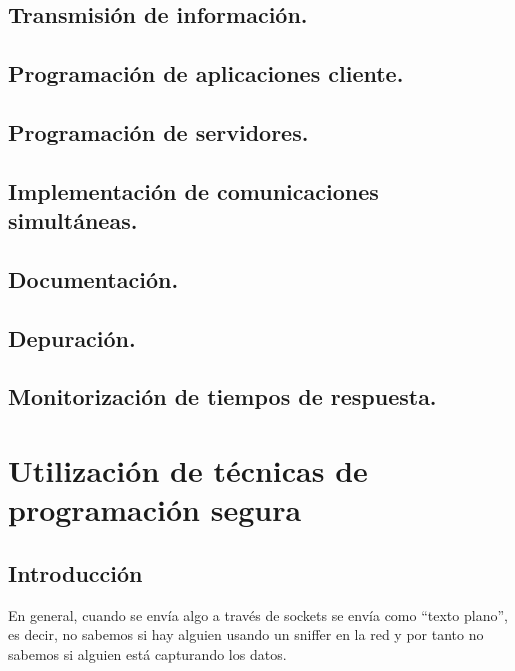 \documentclass[a4paper,12pt,spanish]{sphinxmanual}
\begin{document}
\section{Transmisión de información.}
\label{textos/tema4:transmision-de-informacion}

\section{Programación de aplicaciones cliente.}
\label{textos/tema4:programacion-de-aplicaciones-cliente}

\section{Programación de servidores.}
\label{textos/tema4:programacion-de-servidores}

\section{Implementación de comunicaciones simultáneas.}
\label{textos/tema4:implementacion-de-comunicaciones-simultaneas}

\section{Documentación.}
\label{textos/tema4:documentacion}

\section{Depuración.}
\label{textos/tema4:depuracion}

\section{Monitorización de tiempos de respuesta.}
\label{textos/tema4:monitorizacion-de-tiempos-de-respuesta}

\chapter{{}Utilización de técnicas de programación segura}
\label{textos/tema5::doc}\label{textos/tema5:utilizacion-de-tecnicas-de-programacion-segura}

\section{Introducción}
\label{textos/tema5:introduccion}
En general, cuando se envía algo a través de sockets se envía como ``texto plano'', es decir, no sabemos si hay alguien usando un sniffer en la red y por tanto no sabemos si alguien está capturando los datos.
\end{document}
